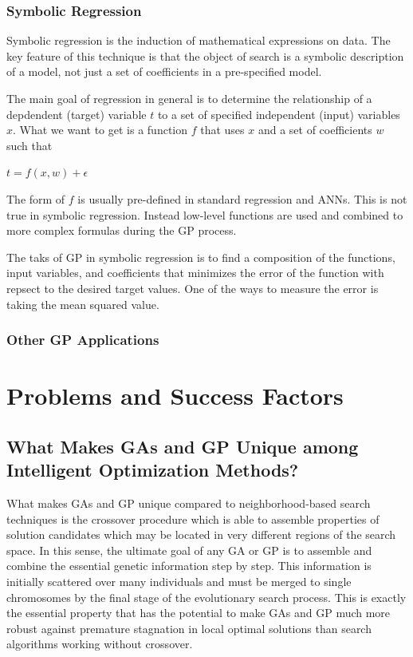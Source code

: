 \documentclass[12pt]{book}
\begin{document}
\subsection{Symbolic Regression}
Symbolic regression is the induction of mathematical expressions on data. The key feature of this technique is that the object of search is a symbolic description of a model, not just a set of coefficients in a pre-specified model.

The main goal of regression in general is to determine the relationship of a depdendent (target) variable $t$ to a set of specified independent (input) variables $x$. What we want to get is a function $f$ that uses $x$ and a set of coefficients $w$ such that
\begin{center}
$t = f(x,w) + \epsilon$
\end{center}
The form of $f$ is usually pre-defined in standard regression and ANNs. This is not true in symbolic regression. Instead low-level functions are used and combined to more complex formulas during the GP process.

The taks of GP in symbolic regression is to find a composition of the functions, input variables, and coefficients that minimizes the error of the function with repsect to the desired target values. One of the ways to measure the error is taking the mean squared value.
\subsection{Other GP Applications}
\clearpage
\chapter{Problems and Success Factors}
\section{What Makes GAs and GP Unique among Intelligent Optimization Methods?}
What makes GAs and GP unique compared to neighborhood-based search techniques is the crossover procedure which is able to assemble properties of solution candidates which may be located in very different regions of the search space. In this sense, the ultimate goal of any GA or GP is to assemble and combine the essential genetic information step by step. This information is initially scattered over many individuals and must be merged to single chromosomes by the final stage of the evolutionary search process. This is exactly the essential property that has the potential to make GAs and GP much more robust against premature stagnation in local optimal solutions than search algorithms working without crossover.
\end{document}
